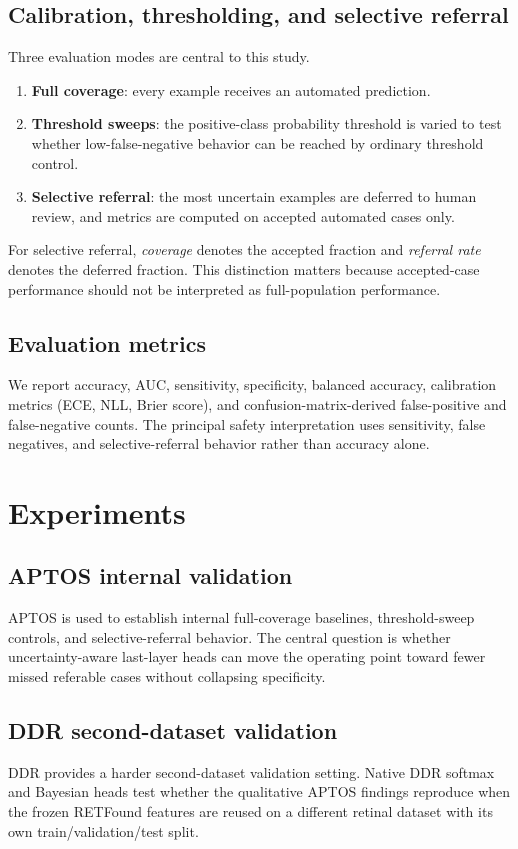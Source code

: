 \documentclass[11pt]{article}
\begin{document}
\subsection{Calibration, thresholding, and selective referral}
Three evaluation modes are central to this study.
\begin{enumerate}[leftmargin=1.2em]
\item \textbf{Full coverage}: every example receives an automated prediction.
\item \textbf{Threshold sweeps}: the positive-class probability threshold is varied to test whether low-false-negative behavior can be reached by ordinary threshold control.
\item \textbf{Selective referral}: the most uncertain examples are deferred to human review, and metrics are computed on accepted automated cases only.
\end{enumerate}

For selective referral, \emph{coverage} denotes the accepted fraction and \emph{referral rate} denotes the deferred fraction. This distinction matters because accepted-case performance should not be interpreted as full-population performance.

\subsection{Evaluation metrics}
We report accuracy, AUC, sensitivity, specificity, balanced accuracy, calibration metrics (ECE, NLL, Brier score), and confusion-matrix-derived false-positive and false-negative counts. The principal safety interpretation uses sensitivity, false negatives, and selective-referral behavior rather than accuracy alone.

\section{Experiments}

\subsection{APTOS internal validation}
APTOS is used to establish internal full-coverage baselines, threshold-sweep controls, and selective-referral behavior. The central question is whether uncertainty-aware last-layer heads can move the operating point toward fewer missed referable cases without collapsing specificity.

\subsection{DDR second-dataset validation}
DDR provides a harder second-dataset validation setting. Native DDR softmax and Bayesian heads test whether the qualitative APTOS findings reproduce when the frozen RETFound features are reused on a different retinal dataset with its own train/validation/test split.
\end{document}
